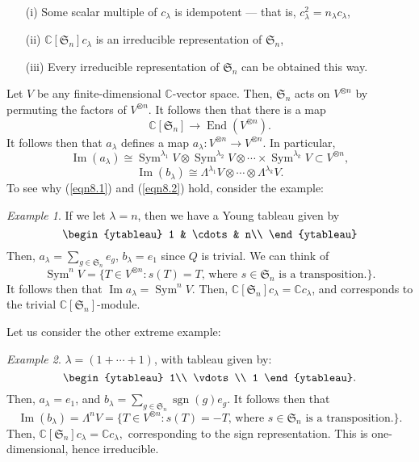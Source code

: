 \documentclass[a4paper]{report}
\theoremstyle{definition}
\theoremstyle{remark}
\theoremstyle{proposition}
\theoremstyle{conjecture}
\theoremstyle{lemma}
\theoremstyle{corollary}
\theoremstyle{exercise}
\theoremstyle{example}
\newtheorem{example}{Example}
\newcommand{\C}{\mathbb{C}}
\newcommand{\on}{\operatorname}
\begin{document}
\begin{theorem}\label{thm20}
    \leavevmode
    \begin{itemize}
        \item[(i)] Some scalar multiple of $c_\lambda$ is idempotent --- 
            that is, $c_\lambda^2 = n_\lambda c_\lambda$,
        \item[(ii)] $\C[\mathfrak{S}_n]c_\lambda$ is an irreducible
            representation of $\mathfrak{S}_n$,
        \item[(iii)] Every irreducible representation of $\mathfrak{S}_n$ 
            can be obtained this way.
    \end{itemize}
\end{theorem}

Let $V$ be any finite-dimensional $\C$-vector space. 
Then, $\mathfrak{S}_n$ acts on $V^{\otimes n}$ by permuting 
the factors of $V^{\otimes n}$. It follows then that there is 
a map 
$$\C[\mathfrak{S}_n] \longrightarrow \on{End}(V^{\otimes n}).$$
It follows then that $a_\lambda$ defines a map 
$a_\lambda : V^{\otimes n}\to V^{\otimes n}$. In particular,
\begin{equation}\label{eqn8.1}
    \on{Im}(a_\lambda) \cong \on{Sym}^{\lambda_1}V \otimes \on{Sym}^{\lambda_2} V \otimes \cdots \times \on{Sym}^{\lambda_k}V \subset V^{\otimes n},
\end{equation}
\begin{equation}\label{eqn8.2}
    \on{Im}(b_\lambda) \cong \Lambda^{\lambda_1}V \otimes \cdots \otimes\Lambda^{\lambda_k}V.
\end{equation}
To see why (\ref{eqn8.1}) and (\ref{eqn8.2}) hold, consider the example:
\begin{example}
    If we let $\lambda = n$, then we have a Young tableau
    given by 
    $$\begin{ytableau}
        1 & \cdots & n\\
    \end{ytableau}$$
    Then, $a_\lambda = \sum_{g\in \mathfrak{S}_n}e_g$,
    $b_\lambda = e_1$ since $Q$ is trivial.
    We can think of 
    $$\on{Sym}^nV = \lbrace T \in V^{\otimes n} : \text{$s(T) = T$, where $s\in\mathfrak{S}_n$ is a transposition.}\rbrace.$$
    It follows then that $\on{Im}a_\lambda = \on{Sym}^nV$.
    Then, $\C[\mathfrak{S}_n]c_\lambda = \C c_\lambda$, and 
    corresponds to the trivial $\C[\mathfrak{S}_n]$-module.
\end{example}
Let us consider the other extreme example:
\begin{example}
    $\lambda = (1+\cdots + 1)$, with tableau given by:
    $$\begin{ytableau}
        1\\
        \vdots\\
        1
    \end{ytableau}.$$
    Then, $a_\lambda = e_1$, and $b_\lambda = \sum_{g \in \mathfrak{S}_n} \on{sgn}(g) e_g$. 
    It follows then that 
    $$\on{Im}(b_\lambda) = \Lambda^nV = \lbrace T \in V^{\otimes n} : \text{$s(T) = -T$, where $s \in \mathfrak{S}_n$ is a transposition.}\rbrace.$$
    Then, $\C[\mathfrak{S}_n]c_\lambda = \C c_\lambda,$
    corresponding to the sign representation. This is 
    one-dimensional, hence irreducible.
\end{example}
\end{document}
